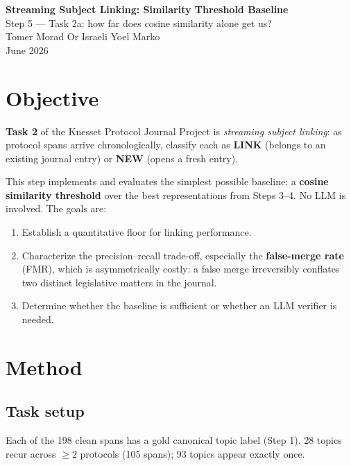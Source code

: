 \documentclass[11pt,a4paper]{article}
\begin{document}
\begin{center}
  {\LARGE \textbf{Streaming Subject Linking: Similarity Threshold Baseline}}\\[0.3em]
  {\large Step 5 --- Task 2a: how far does cosine similarity alone get us?}\\[0.6em]
  {\normalsize Tomer Morad \quad Or Israeli \quad Yoel Marko}\\
  {\normalsize June 2026}
\end{center}

\vspace{0.5em}

\section{Objective}

\textbf{Task 2} of the Knesset Protocol Journal Project is \emph{streaming subject linking}:
as protocol spans arrive chronologically, classify each as
\textbf{LINK} (belongs to an existing journal entry) or \textbf{NEW} (opens a fresh entry).

This step implements and evaluates the simplest possible baseline: a \textbf{cosine similarity
threshold} over the best representations from Steps 3--4.  No LLM is involved.  The goals are:
\begin{enumerate}[noitemsep]
  \item Establish a quantitative floor for linking performance.
  \item Characterize the precision--recall trade-off, especially the
        \textbf{false-merge rate} (FMR), which is asymmetrically costly: a false merge
        irreversibly conflates two distinct legislative matters in the journal.
  \item Determine whether the baseline is sufficient or whether an LLM verifier is needed.
\end{enumerate}

\section{Method}

\subsection{Task setup}

Each of the 198 clean spans has a gold canonical topic label (Step 1).  28 topics
recur across $\ge 2$ protocols (105 spans); 93 topics appear exactly once.
\end{document}
